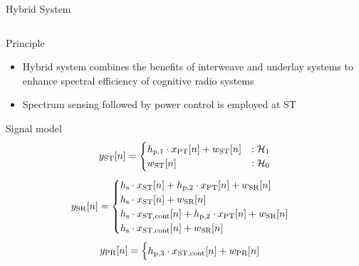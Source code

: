 \documentclass[16pt]{beamer}
\newcommand{\fs}[2]{\fontsize{#1 pt}{#2}\selectfont}
\begin{document}
\begin{frame}[t]{Hybrid System}
	\vspace{-4mm}
	\fs{7}{8}
	\begin{columns}
		\begin{column}{0.45\columnwidth}
			\begin{block}{\scriptsize Principle} 
				\begin{itemize}
					\item Hybrid system combines the benefits of interweave and underlay systems to enhance spectral efficiency of cognitive radio systems  
					\item Spectrum sensing followed by power control is employed at ST 
				\end{itemize}
			\end{block}
			\vspace{3mm}
			{
				\begin{block}{\scriptsize Signal model} %
				\begin{equation*}
					y_{\text{ST}}[n] = 
					\begin{cases}
						h_{\text{p,1}} \cdot x_{\text{PT}}[n] + w_{\text{ST}}[n] & : \mathcal{H}_1 \\
						w_{\text{ST}}[n] & :\mathcal{H}_0
					\end{cases}
				\end{equation*}
				\begin{equation*}
					\ys[n] = 
					\begin{cases}
						\hs \cdot \xsfull[n] + \hptw \cdot \xp[n] + \wsr[n] \\%
						\hs \cdot \xsfull[n] + \wsr[n] \\%
						\hs \cdot \xscont[n] + \hptw \cdot \xp[n] + \wsr[n] \\%
						\hs \cdot \xscont[n] + \wsr[n] %
					\end{cases}
				\end{equation*}
				\begin{equation*}
					\yp[n] = 
					\begin{cases}
						\hpth \cdot \xscont[n] + \wpr[n] \\%

\end{cases}
\end{equation*}
\end{block}}
\end{column}
\end{columns}
\end{frame}
\end{document}
